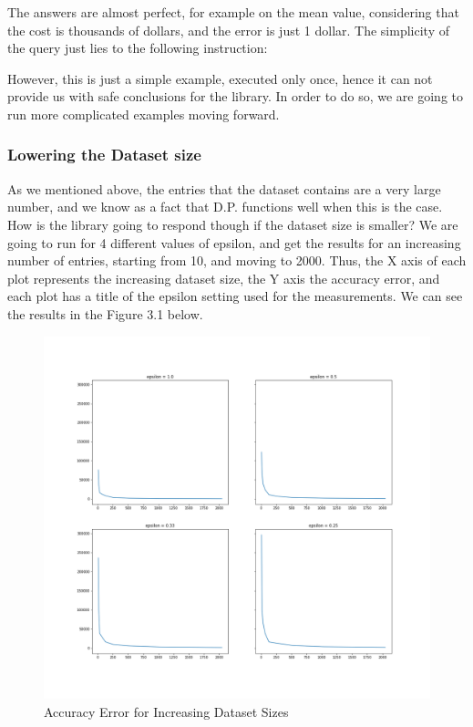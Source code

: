 The answers are almost perfect, for example on the mean value, considering that the cost is thousands of dollars, and the error is just 1 dollar. The simplicity of the query just lies to the following instruction:

However, this is just a simple example, executed only once, hence it can not provide us with safe conclusions for the library. In order to do so, we are going to run more complicated examples moving forward.

\subsubsection{Lowering the Dataset size}

As we mentioned above, the entries that the dataset contains are a very large number, and we know as a fact that D.P. functions well when this is the case. How is the library going to respond though if the dataset size is smaller? We are going to run for 4 different values of epsilon, and get the results for an increasing number of entries, starting from 10, and moving to 2000. Thus, the X axis of each plot represents the increasing dataset size, the Y axis the accuracy error, and each plot has a title of the epsilon setting used for the measurements. We can see the results in the Figure 3.1 below.

\begin{figure}[!htb]\centering
    \includegraphics[width=1\textwidth]{images/increasing_ds_size.png}
    \caption{Accuracy Error for Increasing Dataset Sizes}
\end{figure}


